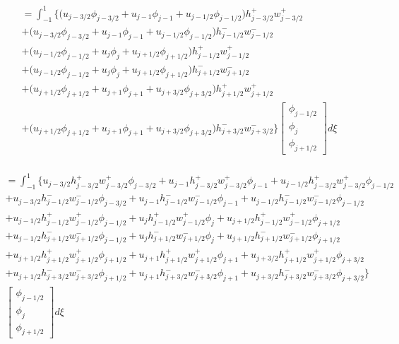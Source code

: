 \documentclass[12pt]{article}
\begin{document}
\begin{multline*}
= \int_{-1}^{1}  \bigg\lbrace \bigg(u_{j - 3/2}\phi_{j - 3/2} + u_{j - 1}\phi_{j - 1} + u_{j - 1/2}\phi_{j - 1/2}\bigg)h^+_{j - 3/2}w^+_{j - 3/2}
\\ +\bigg(u_{j - 3/2}\phi_{j - 3/2} + u_{j - 1}\phi_{j - 1} + u_{j - 1/2}\phi_{j - 1/2} \bigg)h^-_{j - 1/2}w^-_{j - 1/2}
\\ +\bigg(u_{j - 1/2}\phi_{j - 1/2} + u_{j}\phi_{j } + u_{j + 1/2}\phi_{j + 1/2} \bigg)h^+_{j - 1/2}w^+_{j - 1/2}
\\ +\bigg(u_{j - 1/2}\phi_{j - 1/2} + u_{j}\phi_{j } + u_{j + 1/2}\phi_{j + 1/2} \bigg)h^-_{j + 1/2}w^-_{j + 1/2} 
\\ +\bigg( u_{j + 1/2}\phi_{j + 1/2} + u_{j + 1}\phi_{j + 1} + u_{j + 3/2}\phi_{j + 3/2}\bigg)h^+_{j + 1/2}w^+_{j + 1/2} 
\\ +\bigg(u_{j + 1/2}\phi_{j + 1/2} + u_{j + 1}\phi_{j + 1} + u_{j + 3/2}\phi_{j + 3/2}\bigg)h^-_{j + 3/2}w^-_{j + 3/2}\bigg\rbrace \left[\begin{array}{c}\phi_{j-1/2} \\\phi_{j}\\\phi_{j+1/2} \end{array}\right] d\xi\\ 
\end{multline*}

\begin{multline*}
= \int_{-1}^{1}  \bigg\lbrace u_{j - 3/2} h^+_{j - 3/2}w^+_{j - 3/2} \phi_{j - 3/2} + u_{j - 1} h^+_{j - 3/2}w^+_{j - 3/2}\phi_{j - 1} + u_{j - 1/2} h^+_{j - 3/2}w^+_{j - 3/2}\phi_{j - 1/2}
\\ +u_{j - 3/2}h^-_{j - 1/2}w^-_{j - 1/2}\phi_{j - 3/2} + u_{j - 1}h^-_{j - 1/2}w^-_{j - 1/2}\phi_{j - 1} + u_{j - 1/2}h^-_{j - 1/2}w^-_{j - 1/2}\phi_{j - 1/2} 
\\ +u_{j - 1/2}h^+_{j - 1/2}w^+_{j - 1/2}\phi_{j - 1/2} + u_{j}h^+_{j - 1/2}w^+_{j - 1/2}\phi_{j } + u_{j + 1/2}h^+_{j - 1/2}w^+_{j - 1/2}\phi_{j + 1/2} 
\\ +u_{j - 1/2}h^-_{j + 1/2}w^-_{j + 1/2} \phi_{j - 1/2} + u_{j}h^-_{j + 1/2}w^-_{j + 1/2} \phi_{j } + u_{j + 1/2}h^-_{j + 1/2}w^-_{j + 1/2} \phi_{j + 1/2} 
\\ + u_{j + 1/2}h^+_{j + 1/2}w^+_{j + 1/2}\phi_{j + 1/2} + u_{j + 1}h^+_{j + 1/2}w^+_{j + 1/2}\phi_{j + 1} + u_{j + 3/2}h^+_{j + 1/2}w^+_{j + 1/2}\phi_{j + 3/2} 
\\ +u_{j + 1/2}h^-_{j + 3/2}w^-_{j + 3/2}\phi_{j + 1/2} + u_{j + 1}h^-_{j + 3/2}w^-_{j + 3/2}\phi_{j + 1} + u_{j + 3/2}h^-_{j + 3/2}w^-_{j + 3/2}\phi_{j + 3/2}\bigg\rbrace\\ \left[\begin{array}{c}\phi_{j-1/2} \\\phi_{j}\\\phi_{j+1/2} \end{array}\right] d\xi\\ 
\end{multline*}
\end{document}
